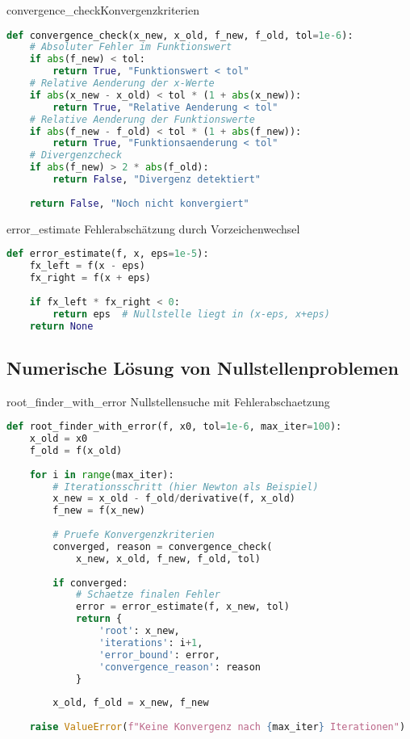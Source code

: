 \begin{examplecode}{convergence\_check}Konvergenzkriterien
\begin{lstlisting}[language=Python, style=basesmol]
def convergence_check(x_new, x_old, f_new, f_old, tol=1e-6):
    # Absoluter Fehler im Funktionswert
    if abs(f_new) < tol:
        return True, "Funktionswert < tol"
    # Relative Aenderung der x-Werte 
    if abs(x_new - x_old) < tol * (1 + abs(x_new)):
        return True, "Relative Aenderung < tol"
    # Relative Aenderung der Funktionswerte
    if abs(f_new - f_old) < tol * (1 + abs(f_new)):
        return True, "Funktionsaenderung < tol"
    # Divergenzcheck
    if abs(f_new) > 2 * abs(f_old):
        return False, "Divergenz detektiert"
        
    return False, "Noch nicht konvergiert"
\end{lstlisting}
\end{examplecode}

\begin{examplecode}{error\_estimate} Fehlerabschätzung durch Vorzeichenwechsel
\begin{lstlisting}[language=Python, style=basesmol]
def error_estimate(f, x, eps=1e-5):
    fx_left = f(x - eps)
    fx_right = f(x + eps)
    
    if fx_left * fx_right < 0:
        return eps  # Nullstelle liegt in (x-eps, x+eps)
    return None
\end{lstlisting}
\end{examplecode}

\subsection{Numerische Lösung von Nullstellenproblemen}

\begin{examplecode}{root\_finder\_with\_error}
    Nullstellensuche mit Fehlerabschaetzung
\begin{lstlisting}[language=Python, style=basesmol]
def root_finder_with_error(f, x0, tol=1e-6, max_iter=100):
    x_old = x0
    f_old = f(x_old)
    
    for i in range(max_iter):
        # Iterationsschritt (hier Newton als Beispiel)
        x_new = x_old - f_old/derivative(f, x_old)
        f_new = f(x_new)
        
        # Pruefe Konvergenzkriterien
        converged, reason = convergence_check(
            x_new, x_old, f_new, f_old, tol)
            
        if converged:
            # Schaetze finalen Fehler
            error = error_estimate(f, x_new, tol)
            return {
                'root': x_new,
                'iterations': i+1,
                'error_bound': error,
                'convergence_reason': reason
            }
            
        x_old, f_old = x_new, f_new
        
    raise ValueError(f"Keine Konvergenz nach {max_iter} Iterationen")
\end{lstlisting}
\end{examplecode}

